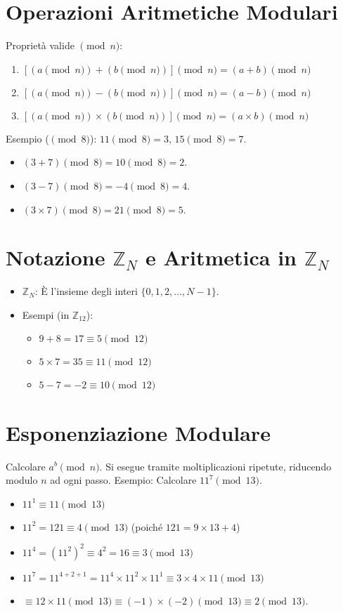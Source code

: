 \documentclass{article}
\begin{document}
\section{Operazioni Aritmetiche Modulari}
Proprietà valide $\pmod n$:
\begin{enumerate}
    \item $[(a \pmod n) + (b \pmod n)] \pmod n = (a + b) \pmod n$
    \item $[(a \pmod n) - (b \pmod n)] \pmod n = (a - b) \pmod n$
    \item $[(a \pmod n) \times (b \pmod n)] \pmod n = (a \times b) \pmod n$
\end{enumerate}
Esempio ($\pmod 8$): $11 \pmod 8 = 3$, $15 \pmod 8 = 7$.
\begin{itemize}
    \item $(3+7) \pmod 8 = 10 \pmod 8 = 2$.
    \item $(3-7) \pmod 8 = -4 \pmod 8 = 4$.
    \item $(3 \times 7) \pmod 8 = 21 \pmod 8 = 5$.
\end{itemize}

\section{Notazione $\mathbb{Z}_N$ e Aritmetica in $\mathbb{Z}_N$}
\begin{itemize}
    \item $\mathbb{Z}_N$: È l'insieme degli interi $\{0, 1, 2, \dots, N-1\}$.
    \item Esempi (in $\mathbb{Z}_{12}$):
    \begin{itemize}
        \item $9 + 8 = 17 \equiv 5 \pmod{12}$
        \item $5 \times 7 = 35 \equiv 11 \pmod{12}$
        \item $5 - 7 = -2 \equiv 10 \pmod{12}$
    \end{itemize}
\end{itemize}

\section{Esponenziazione Modulare}
Calcolare $a^b \pmod n$. Si esegue tramite moltiplicazioni ripetute, riducendo modulo $n$ ad ogni passo.
Esempio: Calcolare $11^7 \pmod{13}$.
\begin{itemize}
    \item $11^1 \equiv 11 \pmod{13}$
    \item $11^2 = 121 \equiv 4 \pmod{13}$ (poiché $121 = 9 \times 13 + 4$)
    \item $11^4 = (11^2)^2 \equiv 4^2 = 16 \equiv 3 \pmod{13}$
    \item $11^7 = 11^{4+2+1} = 11^4 \times 11^2 \times 11^1 \equiv 3 \times 4 \times 11 \pmod{13}$
    \item $\equiv 12 \times 11 \pmod{13} \equiv (-1) \times (-2) \pmod{13} \equiv 2 \pmod{13}$.
\end{itemize}
\end{document}

